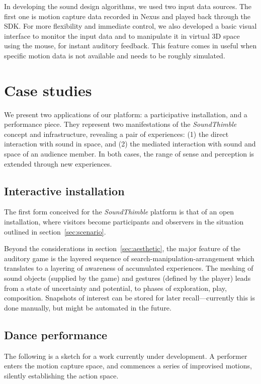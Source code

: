 \documentclass{nime-alternate}
\begin{document}
In developing the sound design algorithms, we used two input data sources. The first one is motion capture data recorded in Nexus and played back through the SDK. For more flexibility and immediate control, we also developed a basic visual interface to monitor the input data and to manipulate it in virtual 3D space using the mouse, for instant auditory feedback. This feature comes in useful when specific motion data is not available and needs to be roughly simulated.

\section{Case studies}
\label{sec:case}

We present two applications of our platform: a participative installation, and a performance piece. They represent two manifestations of the \textit{SoundThimble} concept and infrastructure, revealing a pair of experiences: (1) the direct interaction with sound in space, and (2) the mediated interaction with sound and space of an audience member. In both cases, the range of sense and perception is extended through new experiences.


\subsection{Interactive installation}

The first form conceived for the \textit{SoundThimble} platform is that of an open installation, where visitors become participants and observers in the situation outlined in section~\ref{sec:scenario}.

Beyond the considerations in section~\ref{sec:aesthetic}, the major feature of the auditory game is the layered sequence of search-manipulation-arrangement which translates to a layering of awareness of accumulated experiences. The meshing of sound objects (supplied by the game) and gestures (defined by the player) leads from a state of uncertainty and potential, to phases of exploration, play, composition. Snapshots of interest can be stored for later recall---currently this is done manually, but might be automated in the future.

\subsection{Dance performance}

The following is a sketch for a work currently under development. A performer enters the motion capture space, and commences a series of improvised motions, silently establishing the action space.
\end{document}
